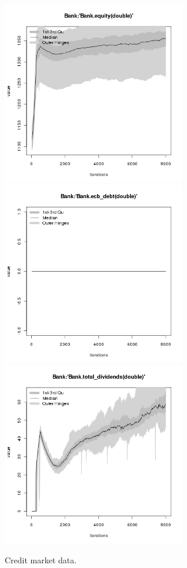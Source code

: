 \begin{figure}[H!]
\begin{minipage}{17cm}
\includegraphics[width=8cm]{./benchmark_plots/Bank-equity.png}\\
\includegraphics[width=8cm]{./benchmark_plots/Bank-ecb_debt.png}
\includegraphics[width=8cm]{./benchmark_plots/Bank-total_dividends.png}
\end{minipage}
\caption{Credit market data.}
\label{Figure: Credit Market}
\end{figure}

%
